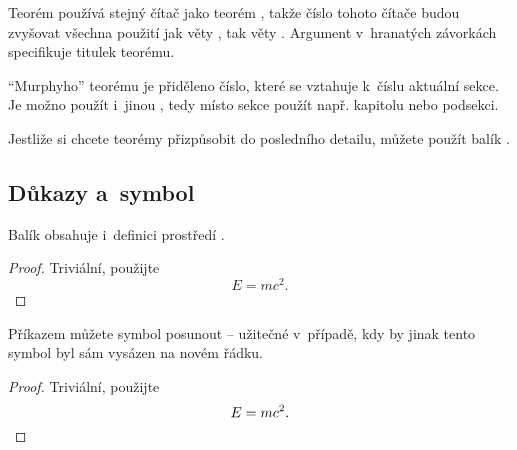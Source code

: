 Teorém  používá stejný čítač jako teorém ,
takže číslo tohoto čítače budou zvyšovat všechna použití
jak věty , tak věty . Argument
v~hranatých závorkách specifikuje titulek teorému.

\begingroup
\renewcommand{\thesection}{\thechapter\arabic{section}}
\endgroup

``Murphyho'' teorému je přiděleno číslo, které se vztahuje k~číslu
aktuální sekce. Je možno použít i~jinou , tedy místo
sekce použít např. kapitolu nebo podsekci.

Jestliže si chcete teorémy přizpůsobit do posledního detailu,
můžete použít balík .


\subsection{Důkazy a~symbol }
\label{sec:putting-qed-right}

Balík  obsahuje i~definici prostředí .

\begin{example}
\begin{proof}
 Triviální, použijte
 \begin{equation*}
   E=mc^2.
 \end{equation*}
\end{proof}
\end{example}

Příkazem  můžete symbol  posunout
-- užitečné v~případě, kdy by jinak tento symbol byl sám vysázen
na novém řádku.

\begin{example}
\begin{proof}
 Triviální, použijte
 \begin{equation*}
   E=mc^2. \qedhere
 \end{equation*}
\end{proof}
\end{example}


